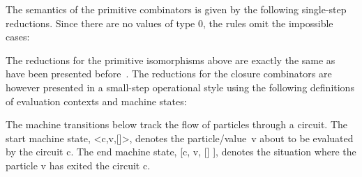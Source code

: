 \documentclass[preprint]{sigplanconf}
\begin{document}
The semantics of the primitive combinators is given by the following
single-step reductions. Since there are no values of type {{0}}, the rules
omit the impossible cases:
\begin{scriptsize}
\end{scriptsize}
The reductions for the primitive isomorphisms above are exactly the same as
have been presented before~\cite{infeffects}. The reductions for the closure
combinators are however presented in a small-step operational style using the
following definitions of evaluation contexts and machine states:

\begin{scriptsize}
\end{scriptsize}
The machine transitions below track the flow of particles through a
circuit. The start machine state, {{<c,v,[]>}}, denotes the
particle/value~{{v}} about to be evaluated by the circuit {{c}}. The end
machine state, {{[c, v, [] ]}}, denotes the situation where the particle
{{v}} has exited the circuit {{c}}.
\end{document}
